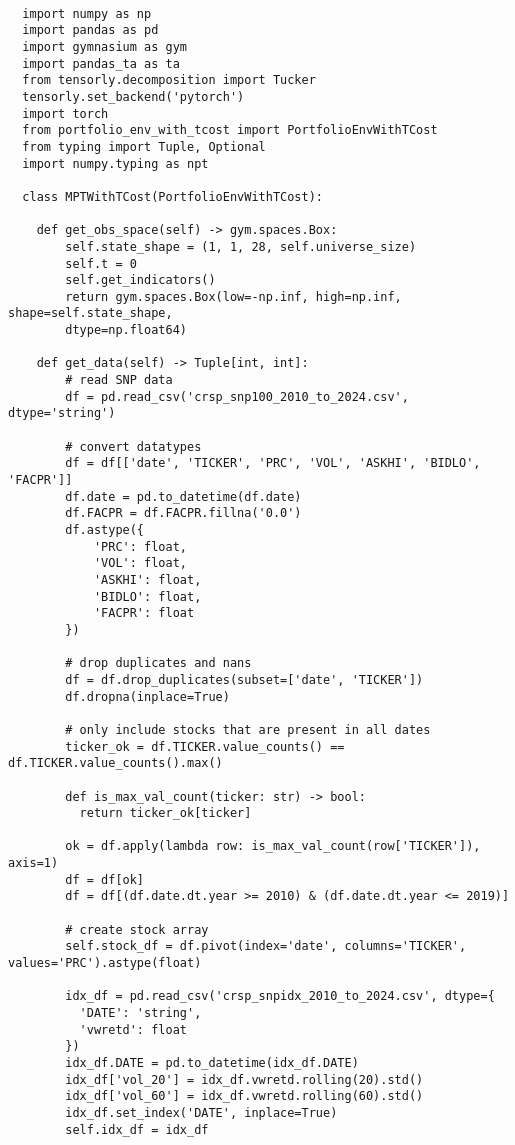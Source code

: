 \begin{verbatim}

  import numpy as np
  import pandas as pd
  import gymnasium as gym
  import pandas_ta as ta
  from tensorly.decomposition import Tucker
  tensorly.set_backend('pytorch')
  import torch
  from portfolio_env_with_tcost import PortfolioEnvWithTCost
  from typing import Tuple, Optional
  import numpy.typing as npt

  class MPTWithTCost(PortfolioEnvWithTCost):

    def get_obs_space(self) -> gym.spaces.Box:
        self.state_shape = (1, 1, 28, self.universe_size)
        self.t = 0
        self.get_indicators()
        return gym.spaces.Box(low=-np.inf, high=np.inf, shape=self.state_shape, 
        dtype=np.float64)
    
    def get_data(self) -> Tuple[int, int]:
        # read SNP data
        df = pd.read_csv('crsp_snp100_2010_to_2024.csv', dtype='string')
    
        # convert datatypes
        df = df[['date', 'TICKER', 'PRC', 'VOL', 'ASKHI', 'BIDLO', 'FACPR']]
        df.date = pd.to_datetime(df.date)
        df.FACPR = df.FACPR.fillna('0.0')
        df.astype({
            'PRC': float,
            'VOL': float,
            'ASKHI': float,
            'BIDLO': float,
            'FACPR': float
        })
    
        # drop duplicates and nans
        df = df.drop_duplicates(subset=['date', 'TICKER'])
        df.dropna(inplace=True)
    
        # only include stocks that are present in all dates
        ticker_ok = df.TICKER.value_counts() == df.TICKER.value_counts().max()

        def is_max_val_count(ticker: str) -> bool:
          return ticker_ok[ticker]
        
        ok = df.apply(lambda row: is_max_val_count(row['TICKER']), axis=1)
        df = df[ok]
        df = df[(df.date.dt.year >= 2010) & (df.date.dt.year <= 2019)]
    
        # create stock array
        self.stock_df = df.pivot(index='date', columns='TICKER', values='PRC').astype(float)
        
        idx_df = pd.read_csv('crsp_snpidx_2010_to_2024.csv', dtype={
          'DATE': 'string',
          'vwretd': float
        })
        idx_df.DATE = pd.to_datetime(idx_df.DATE)
        idx_df['vol_20'] = idx_df.vwretd.rolling(20).std()
        idx_df['vol_60'] = idx_df.vwretd.rolling(60).std()
        idx_df.set_index('DATE', inplace=True)
        self.idx_df = idx_df


\end{verbatim}
